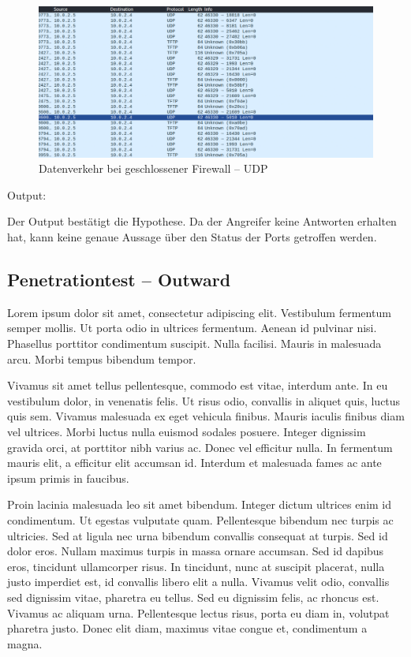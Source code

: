 \begin{figure}
	\includegraphics[width=\linewidth]{img/ws_firewall_closed_udp.png}
	\caption{Datenverkehr bei geschlossener Firewall – UDP}
	\label{fig:ws_firewall_closed_udp}
\end{figure}
Output:


Der Output bestätigt die Hypothese. Da der Angreifer keine Antworten erhalten hat, kann keine genaue Aussage über den Status der Ports getroffen werden. 

\subsection{Penetrationtest – Outward}
Lorem ipsum dolor sit amet, consectetur adipiscing elit. Vestibulum fermentum semper mollis. Ut porta odio in ultrices fermentum. Aenean id pulvinar nisi. Phasellus porttitor condimentum suscipit. Nulla facilisi. Mauris in malesuada arcu. Morbi tempus bibendum tempor.

Vivamus sit amet tellus pellentesque, commodo est vitae, interdum ante. In eu vestibulum dolor, in venenatis felis. Ut risus odio, convallis in aliquet quis, luctus quis sem. Vivamus malesuada ex eget vehicula finibus. Mauris iaculis finibus diam vel ultrices. Morbi luctus nulla euismod sodales posuere. Integer dignissim gravida orci, at porttitor nibh varius ac. Donec vel efficitur nulla. In fermentum mauris elit, a efficitur elit accumsan id. Interdum et malesuada fames ac ante ipsum primis in faucibus.

Proin lacinia malesuada leo sit amet bibendum. Integer dictum ultrices enim id condimentum. Ut egestas vulputate quam. Pellentesque bibendum nec turpis ac ultricies. Sed at ligula nec urna bibendum convallis consequat at turpis. Sed id dolor eros. Nullam maximus turpis in massa ornare accumsan. Sed id dapibus eros, tincidunt ullamcorper risus. In tincidunt, nunc at suscipit placerat, nulla justo imperdiet est, id convallis libero elit a nulla. Vivamus velit odio, convallis sed dignissim vitae, pharetra eu tellus. Sed eu dignissim felis, ac rhoncus est. Vivamus ac aliquam urna. Pellentesque lectus risus, porta eu diam in, volutpat pharetra justo. Donec elit diam, maximus vitae congue et, condimentum a magna. 

